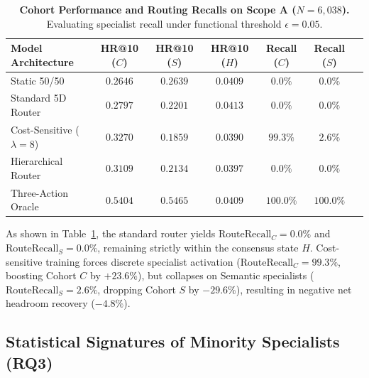 \begin{table}[t]
\centering
\small
\caption{\textbf{Cohort Performance and Routing Recalls on Scope A ($N=6{,}038$).} Evaluating specialist recall under functional threshold $\epsilon=0.05$.}
\label{tab:cohort_recalls}
\begin{tabular}{lcccccc}
\toprule
\textbf{Model Architecture} & \textbf{HR@10 ($C$)} & \textbf{HR@10 ($S$)} & \textbf{HR@10 ($H$)} & \textbf{Recall ($C$)} & \textbf{Recall ($S$)} \\
\midrule
Static 50/50 & $0.2646$ & $0.2639$ & $0.0409$ & $0.0\%$ & $0.0\%$ \\
Standard 5D Router & $0.2797$ & $0.2201$ & $0.0413$ & $0.0\%$ & $0.0\%$ \\
Cost-Sensitive ($\lambda=8$) & $\mathbf{0.3270}$ & $0.1859$ & $0.0390$ & $\mathbf{99.3\%}$ & $2.6\%$ \\
Hierarchical Router & $0.3109$ & $0.2134$ & $0.0397$ & $0.0\%$ & $0.0\%$ \\
Three-Action Oracle & $\mathbf{0.5404}$ & $\mathbf{0.5465}$ & $0.0409$ & $100.0\%$ & $100.0\%$ \\
\bottomrule
\end{tabular}
\end{table}

As shown in Table~\ref{tab:cohort_recalls}, the standard router yields $\text{RouteRecall}_C = 0.0\%$ and $\text{RouteRecall}_S = 0.0\%$, remaining strictly within the consensus state $H$. Cost-sensitive training forces discrete specialist activation ($\text{RouteRecall}_C = 99.3\%$, boosting Cohort $C$ by $+23.6\%$), but collapses on Semantic specialists ($\text{RouteRecall}_S = 2.6\%$, dropping Cohort $S$ by $-29.6\%$), resulting in negative net headroom recovery ($-4.8\%$).

\subsection{Statistical Signatures of Minority Specialists (RQ3)}
\label{sec:signatures}

